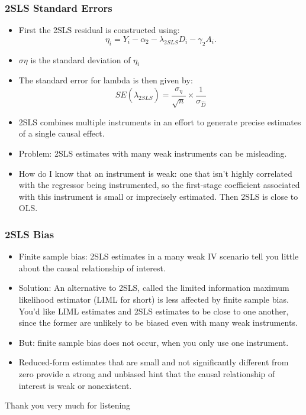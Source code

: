 \documentclass{beamer}
\begin{document}
\begin{frame}
\frametitle{2SLS Standard Errors}

\begin{itemize}
	\item First the 2SLS residual is constructed using: 
	$$\eta_i=Y_i-\alpha_2-\lambda_{2SLS} D_i - \gamma_2 A_i.$$
	\item $\sigma{\eta}$ is the standard deviation of $\eta_i$
	\item The standard error for lambda is then given by: 
	$$SE(\hat{\lambda}_{2SLS})=\frac{\sigma_{\eta}}{\sqrt{n}}\times \frac{1}{\sigma_{\hat{D}}}$$
	\item 2SLS combines multiple instruments in an effort to generate precise estimates of a single causal effect.
	\item Problem: 2SLS estimates with many weak instruments can be misleading.
	\item How do I know that an instrument is weak: one that isn’t highly correlated with the regressor being instrumented, so the first-stage coefficient associated with this instrument is small or imprecisely estimated. Then 2SLS is close to OLS.
\end{itemize}
\end{frame}

\begin{frame}
\frametitle{2SLS Bias}

\begin{itemize}
	\item Finite sample bias: 2SLS estimates in a many weak IV scenario tell you little about the causal relationship of interest.
	\item Solution: An alternative to 2SLS, called the limited information maximum likelihood estimator (LIML for short) is less affected by finite sample bias. You’d like LIML estimates and 2SLS estimates to be close to one another, since the former are unlikely to be biased even with many weak instruments.
	\item But: finite sample bias does not occur, when you only use one instrument.
	\item Reduced-form estimates that are small and not significantly different from zero provide a strong and unbiased hint that the causal relationship of interest is weak or nonexistent.
\end{itemize}
\end{frame}

\begin{frame}
\Huge{\centerline{Thank you very much for listening}}
\end{frame}

\end{document}
